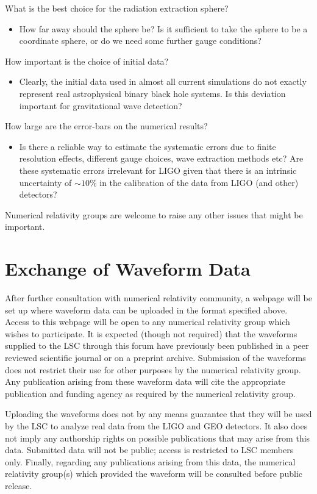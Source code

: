 \documentclass[10pt]{ligodcc}
\begin{document}
What is the best choice for the radiation extraction sphere?
\begin{itemize}
\item How far away should the sphere be?  Is it sufficient to take the
  sphere to be a coordinate sphere, or do we need some further gauge
  conditions?
\end{itemize}
How important is the choice of initial data?
\begin{itemize}
\item Clearly, the initial data used in almost all current simulations
  do not exactly represent real astrophysical binary black hole
  systems.  Is this deviation important for gravitational wave
  detection?
\end{itemize}
How large are the error-bars on the numerical results?
\begin{itemize}
\item Is there a reliable way to estimate the systematic errors due to
  finite resolution effects, different gauge choices, wave extraction
  methods etc?  Are these systematic errors irrelevant for LIGO given
  that there is an intrinsic uncertainty of $\sim 10\%$ in the
  calibration of the data from LIGO (and other) detectors? 
\end{itemize}

Numerical relativity groups are welcome to raise any other issues that
might be important.


\section{Exchange of Waveform Data}
\label{sec:authorship}

After further consultation with numerical relativity community, a
webpage will be set up where waveform data can be uploaded in the
format specified above.  Access to this webpage will be open to any
numerical relativity group which wishes to participate.  It is
expected (though not required) that the waveforms supplied to the LSC
through this forum have previously been published in a peer reviewed
scientific journal or on a preprint archive.  Submission of the
waveforms does not restrict their use for other purposes by the
numerical relativity group.  Any publication arising from these
waveform data will cite the appropriate publication and funding agency
as required by the numerical relativity group.

Uploading the waveforms does not by any means guarantee that they will
be used by the LSC to analyze real data from the LIGO and GEO
detectors.  It also does not imply any authorship rights on possible
publications that may arise from this data.  Submitted data will not
be public; access is restricted to LSC members only.  Finally,
regarding any publications arising from this data, the numerical
relativity group(s) which provided the waveform will be consulted
before public release.
\end{document}
